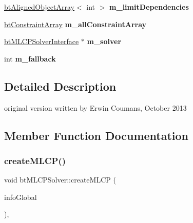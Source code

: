 \begin{DoxyCompactItemize}
\mbox{\label{classbtMLCPSolver_a3b1aa1b04437bd6df431d61154f9622c}} 
\hyperlink{classbtAlignedObjectArray}{bt\+Aligned\+Object\+Array}$<$ int $>$ {\bfseries m\+\_\+limit\+Dependencies}
\item 
\mbox{\label{classbtMLCPSolver_a00881de9aded5d789029b2f86f664eac}} 
\hyperlink{classbtAlignedObjectArray}{bt\+Constraint\+Array} {\bfseries m\+\_\+all\+Constraint\+Array}
\item 
\mbox{\label{classbtMLCPSolver_a35ff4f8a11a21c1b64c064107a44cf9d}} 
\hyperlink{classbtMLCPSolverInterface}{bt\+M\+L\+C\+P\+Solver\+Interface} $\ast$ {\bfseries m\+\_\+solver}
\item 
\mbox{\label{classbtMLCPSolver_ac3debefed2fe370fd95302fef37182bc}} 
int {\bfseries m\+\_\+fallback}
\end{DoxyCompactItemize}


\subsection{Detailed Description}
original version written by Erwin Coumans, October 2013 

\subsection{Member Function Documentation}
\mbox{\label{classbtMLCPSolver_a83c6bc90a6a311204fccec04aa331aee}} 
\subsubsection{\texorpdfstring{create\+M\+L\+C\+P()}{createMLCP()}}
{\footnotesize\ttfamily void bt\+M\+L\+C\+P\+Solver\+::create\+M\+L\+CP (\begin{DoxyParamCaption}\item[{const \hyperlink{structbtContactSolverInfo}{bt\+Contact\+Solver\+Info} \&}]{info\+Global }\end{DoxyParamCaption})\hspace{0.3cm}{\ttfamily [protected]}, {\ttfamily [virtual]}}

